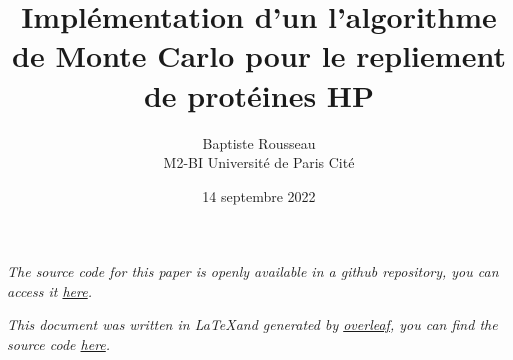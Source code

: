 
\title{Implémentation d'un l'algorithme de Monte Carlo pour le repliement de protéines HP}
\author{Baptiste Rousseau\\ M2-BI Université de Paris Cité}
\date{14 septembre 2022}



\maketitle 


\label{sec:end}

\newpage


\textit{The source code for this paper is openly available in a github repository, you can access it \href{https://github.com/nobabar/Monte-Carlo-HP-Protein-Folding}{here}.}

\textit{This document was written in \LaTeX  and generated by \href{https://fr.overleaf.com/for/authors}{overleaf}, you can find the source code \href{https://www.overleaf.com/read/mqbxpcbpgqsk}{here}.}


